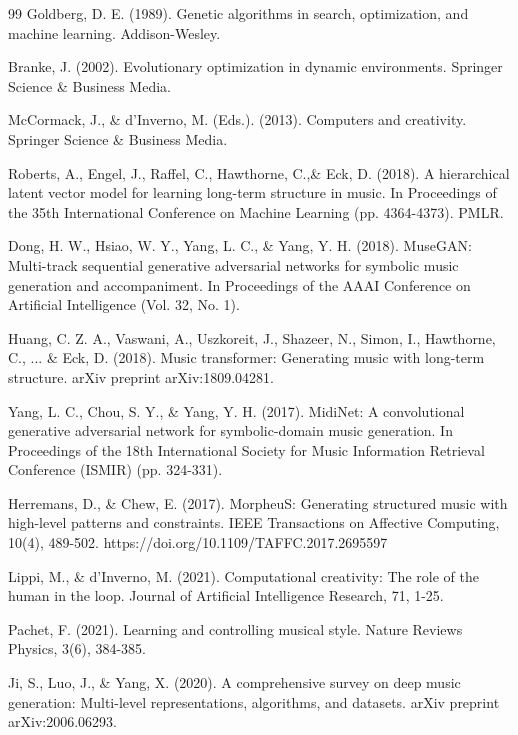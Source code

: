 \documentclass[12pt]{report}
\begin{document}
\begin{thebibliography}{99}
 Goldberg, D. E. (1989). Genetic algorithms in search, optimization, and machine learning. Addison-Wesley.

 Branke, J. (2002). Evolutionary optimization in dynamic environments. Springer Science \& Business Media.

 McCormack, J., \& d'Inverno, M. (Eds.). (2013). Computers and creativity. Springer Science \& Business Media.

 Roberts, A., Engel, J., Raffel, C., Hawthorne, C.,\& Eck, D. (2018). A hierarchical latent vector model for learning long-term structure in music. In Proceedings of the 35th International Conference on Machine Learning (pp. 4364-4373). PMLR.

 Dong, H. W., Hsiao, W. Y., Yang, L. C., \& Yang, Y. H. (2018). MuseGAN: Multi-track sequential generative adversarial networks for symbolic music generation and accompaniment. In Proceedings of the AAAI Conference on Artificial Intelligence (Vol. 32, No. 1).

 Huang, C. Z. A., Vaswani, A., Uszkoreit, J., Shazeer, N., Simon, I., Hawthorne, C., ... \& Eck, D. (2018). Music transformer: Generating music with long-term structure. arXiv preprint arXiv:1809.04281.

 Yang, L. C., Chou, S. Y., \& Yang, Y. H. (2017). MidiNet: A convolutional generative adversarial network for symbolic-domain music generation. In Proceedings of the 18th International Society for Music Information Retrieval Conference (ISMIR) (pp. 324-331).

 Herremans, D., \& Chew, E. (2017). MorpheuS: Generating structured music with high-level patterns and constraints. IEEE Transactions on Affective Computing, 10(4), 489-502. https://doi.org/10.1109/TAFFC.2017.2695597

 Lippi, M., \& d'Inverno, M. (2021). Computational creativity: The role of the human in the loop. Journal of Artificial Intelligence Research, 71, 1-25.

 Pachet, F. (2021). Learning and controlling musical style. Nature Reviews Physics, 3(6), 384-385.

 Ji, S., Luo, J., \& Yang, X. (2020). A comprehensive survey on deep music generation: Multi-level representations, algorithms, and datasets. arXiv preprint arXiv:2006.06293.

\end{thebibliography}
\end{document}
